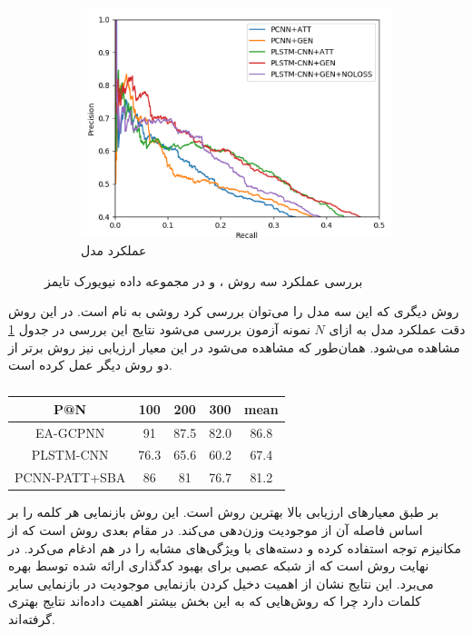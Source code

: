 \begin{figure}[h]
\begin{subfigure}{0.3\linewidth}
        \includegraphics[width=\linewidth]{images/shared/nyt_dataset.png}
        \caption{عملکرد مدل }
    \end{subfigure}
    \caption{بررسی عملکرد سه روش ،  و  در مجموعه داده نیویورک تایمز}
    \label{recall_precision}
\end{figure}

روش دیگری که این سه مدل را می‌توان بررسی کرد روشی به نام  است. در این روش دقت عملکرد مدل به ازای
$N$ نمونه آزمون بررسی می‌شود نتایج این بررسی در جدول \ref{pn} مشاهده می‌شود. همان‌طور که مشاهده می‌شود در این معیار
ارزیابی نیز روش  برتر از دو روش دیگر عمل کرده است.

\begin{latin}
\begin{table}[h]
    \centering
    \caption{}
    \label{pn}
    \begin{tabular}{c|c|c|c|c}
        P@N & 100 & 200 & 300 & mean \\
        \hline
        EA-GCPNN & 91 & 87.5 & 82.0 & 86.8 \\
        PLSTM-CNN & 76.3 & 65.6 & 60.2 & 67.4 \\
        PCNN-PATT+SBA & 86 & 81 & 76.7 & 81.2
    \end{tabular}
\end{table}
\end{latin}

بر طبق معیار‌های ارزیابی بالا بهترین روش  است. این روش بازنمایی هر کلمه را بر اساس فاصله آن از موجودیت
وزن‌دهی می‌کند. در مقام بعدی روش  است که از مکانیزم توجه استفاده کرده و
دسته‌های با ویژگی‌های مشابه را در هم ادغام می‌کرد. در نهایت روش  است که از شبکه عصبی 
برای بهبود کدگذاری ارائه شده توسط  بهره می‌برد. این نتایج نشان از اهمیت دخیل کردن بازنمایی موجودیت در
بازنمایی سایر کلمات دارد چرا که روش‌هایی که به این بخش بیشتر اهمیت داده‌اند نتایج بهتری گرفته‌اند.

